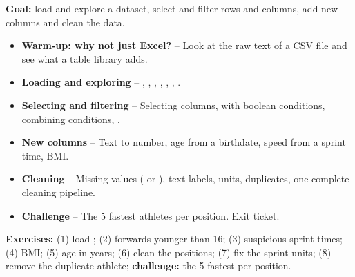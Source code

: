 \textbf{Goal:} load and explore a dataset, select and filter rows and
columns, add new columns and clean the data.

\begin{itemize}
  \item \textbf{Warm-up: why not just Excel?} -- Look at the raw text of a CSV file and see what a table library adds.
  \item \textbf{Loading and exploring} -- , , , , , , .
  \item \textbf{Selecting and filtering} -- Selecting columns,  with boolean conditions, combining conditions, .
  \item \textbf{New columns} -- Text to number, age from a birthdate, speed from a sprint time, BMI.
  \item \textbf{Cleaning} -- Missing values ( or ), text labels, units, duplicates, one complete cleaning pipeline.
  \item \textbf{Challenge} -- The 5 fastest athletes per position. Exit ticket.
\end{itemize}

\textbf{Exercises:} (1) load ; (2) forwards younger than
16; (3) suspicious sprint times; (4) BMI; (5) age in years; (6) clean the
positions; (7) fix the sprint units; (8) remove the duplicate athlete;
\textbf{challenge:} the 5 fastest per position.
